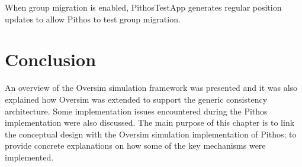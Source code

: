 When group migration is enabled, PithosTestApp generates regular position updates to allow Pithos to test group migration.

\section{Conclusion}

An overview of the Oversim simulation framework was presented and it was also explained how Oversim was extended to support the generic consistency architecture. Some implementation issues encountered during the Pithos implementation were also discussed. The main purpose of this chapter is to link the conceptual design with the Oversim simulation implementation of Pithos; to provide concrete explanations on how some of the key mechanisms were implemented.
